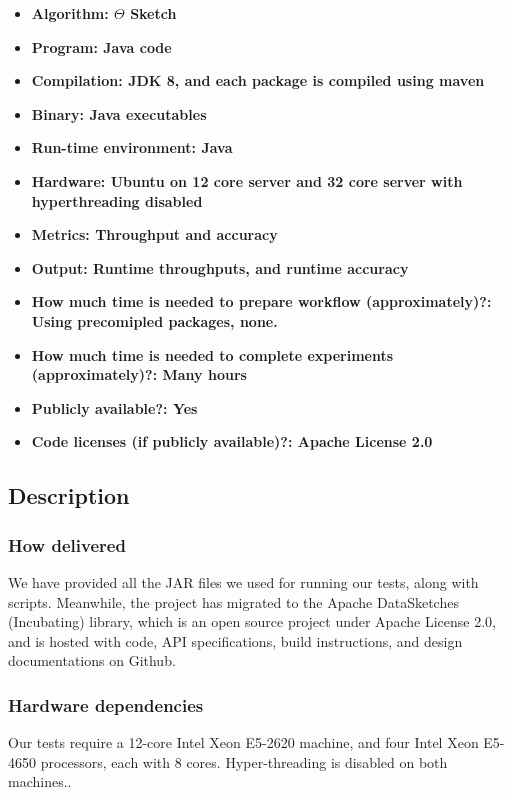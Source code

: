 {\small
\begin{itemize}
  \item {\bf Algorithm: $\Theta$ Sketch}
  \item {\bf Program: Java code}
  \item {\bf Compilation: JDK 8, and each package is compiled using maven}
  \item {\bf Binary: Java executables}
  \item {\bf Run-time environment: Java}
  \item {\bf Hardware: Ubuntu on 12 core server and 32 core server with hyperthreading disabled}
  \item {\bf Metrics: Throughput and accuracy}
  \item {\bf Output: Runtime throughputs, and runtime accuracy}
  \item {\bf How much time is needed to prepare workflow (approximately)?: Using precomipled packages, none.}
  \item {\bf How much time is needed to complete experiments (approximately)?: Many hours}
  \item {\bf Publicly available?: Yes}
  \item {\bf Code licenses (if publicly available)?: Apache License 2.0}
\end{itemize}

\subsection{Description}

\subsubsection{How delivered}

We have provided all the JAR files we used for running our tests, along with scripts. Meanwhile, the project
has migrated to the Apache DataSketches (Incubating) library, which is an open source project
under Apache License 2.0, and is hosted with code, API specifications,
build instructions, and design documentations on Github.

\subsubsection{Hardware dependencies}
Our tests require a 12-core Intel Xeon E5-2620 machine, and four Intel
Xeon E5-4650 processors, each with $8$ cores. Hyper-threading is disabled on both machines..

}
